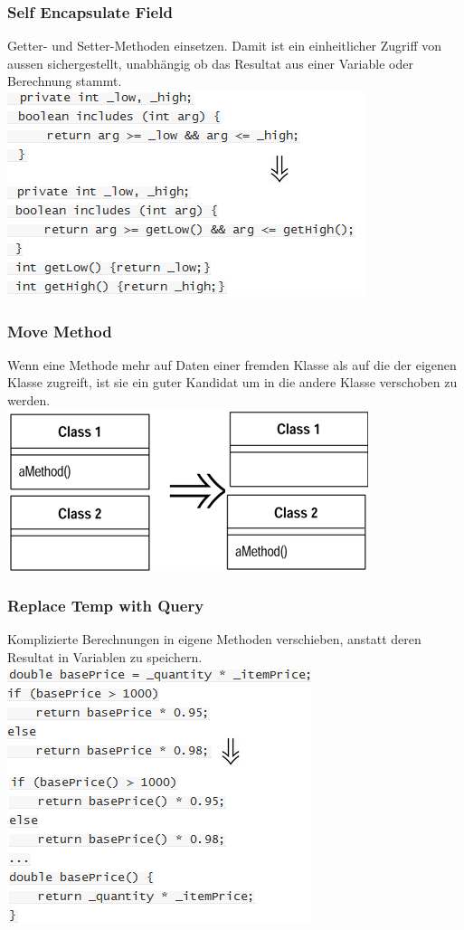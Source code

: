 \documentclass[a4paper,10pt]{article}
\begin{document}
\subsubsection{Self Encapsulate Field}
Getter- und Setter-Methoden einsetzen. Damit ist ein einheitlicher Zugriff von aussen sichergestellt, unabh\"{a}ngig ob das Resultat aus einer Variable oder Berechnung stammt.\\
\includegraphics[scale=.6]{refactoring_2.png}
\subsubsection{Move Method}
Wenn eine Methode mehr auf Daten einer fremden Klasse als auf die der eigenen Klasse zugreift, ist sie ein guter Kandidat um in die andere Klasse verschoben zu werden.\\
\includegraphics[scale=.6]{refactoring_3.png}
\subsubsection{Replace Temp with Query}
Komplizierte Berechnungen in eigene Methoden verschieben, anstatt deren Resultat in Variablen zu speichern.\\
\includegraphics[scale=.6]{refactoring_4.png}
\end{document}
